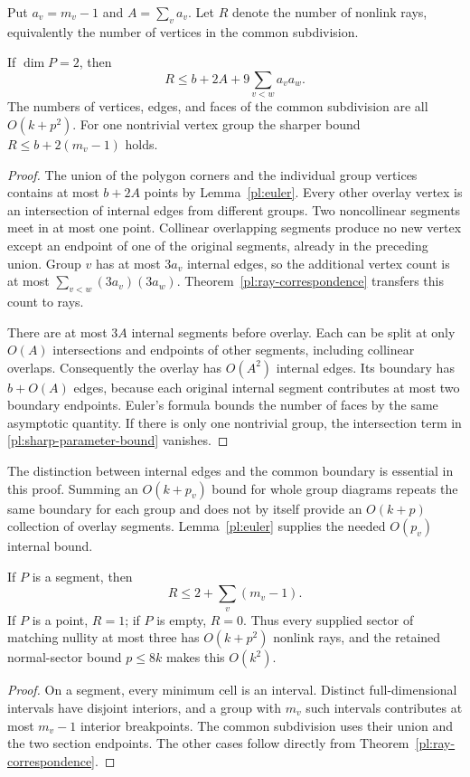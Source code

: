 Put \(a_v=m_v-1\) and \(A=\sum_va_v\).
Let \(R\) denote the number of nonlink rays, equivalently the number
of vertices in the common subdivision.

\begin{theorem}
\label{pl:quadratic-bound}
If \(\dim P=2\), then
\begin{equation}
 R\leq b+2A+9\sum_{v<w}a_va_w.
 \label{pl:sharp-parameter-bound}
\end{equation}
The numbers of vertices, edges, and faces of the common subdivision
are all \(O(k+p^2)\).  For one nontrivial vertex group the sharper
bound \(R\leq b+2(m_v-1)\) holds.
\end{theorem}
\begin{proof}
The union of the polygon corners and the individual group vertices
contains at most \(b+2A\) points by Lemma~\ref{pl:euler}.
Every other overlay vertex is an intersection of internal edges
from different groups.  Two noncollinear segments meet in at most
one point.  Collinear overlapping segments produce no new vertex
except an endpoint of one of the original segments, already in
the preceding union.  Group \(v\) has at most \(3a_v\) internal
edges, so the additional vertex count is at most
\(\sum_{v<w}(3a_v)(3a_w)\).
Theorem~\ref{pl:ray-correspondence} transfers this count to rays.

There are at most \(3A\) internal segments before overlay.
Each can be split at only \(O(A)\) intersections and endpoints
of other segments, including collinear overlaps.
Consequently the overlay has \(O(A^2)\) internal edges.
Its boundary has \(b+O(A)\) edges, because each original internal
segment contributes at most two boundary endpoints.
Euler's formula bounds the number of faces by the same asymptotic
quantity.  If there is only one nontrivial group, the intersection
term in \eqref{pl:sharp-parameter-bound} vanishes.
\end{proof}

The distinction between internal edges and the common boundary is
essential in this proof.  Summing an \(O(k+p_v)\) bound for whole
group diagrams repeats the same boundary for each group and does
not by itself provide an \(O(k+p)\) collection of overlay segments.
Lemma~\ref{pl:euler} supplies the needed \(O(p_v)\) internal bound.

\begin{corollary}
\label{pl:lowdim}
If \(P\) is a segment, then
\[
 R\leq2+\sum_v(m_v-1).
\]
If \(P\) is a point, \(R=1\); if \(P\) is empty, \(R=0\).
Thus every supplied sector of matching nullity at most three has
\(O(k+p^2)\) nonlink rays, and the retained normal-sector bound
\(p\leq8k\) makes this \(O(k^2)\).
\end{corollary}
\begin{proof}
On a segment, every minimum cell is an interval.
Distinct full-dimensional intervals have disjoint interiors,
and a group with \(m_v\) such intervals contributes at most
\(m_v-1\) interior breakpoints.
The common subdivision uses their union and the two section
endpoints.  The other cases follow directly from
Theorem~\ref{pl:ray-correspondence}.
\end{proof}

